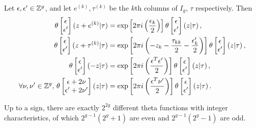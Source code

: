 \documentclass{article}
\begin{document}
\begin{prop}
	Let $\epsilon, \epsilon^\prime \in \mathbb{Z}^g$, and let $e^{(k)}, \tau^{(k)}$ be the $k$th columns of $I_g, \, \tau$ respectively. Then 
	\begin{align*}
		\theta\begin{bmatrix} \epsilon \\ \epsilon^\prime \end{bmatrix}(z+e^{(k)}|\tau) &= \exp\left[ 2\pi i \left( \frac{\epsilon_k}{2} \right) \right]\theta\begin{bmatrix} \epsilon \\ \epsilon^\prime \end{bmatrix}(z|\tau) \, , \\
		\theta\begin{bmatrix} \epsilon \\ \epsilon^\prime \end{bmatrix}(z+\tau^{(k)}|\tau) &= \exp\left[ 2\pi i \left( -z_k - \frac{\tau_{kk}}{2}-\frac{\epsilon^\prime_k}{2} \right) \right]\theta\begin{bmatrix} \epsilon \\ \epsilon^\prime \end{bmatrix}(z|\tau) \, , \\
		\theta\begin{bmatrix} \epsilon \\ \epsilon^\prime \end{bmatrix}(-z|\tau) &= \exp\left[ 2\pi i \left( \frac{\epsilon^T\epsilon^\prime }{2} \right) \right]\theta\begin{bmatrix} \epsilon \\ \epsilon^\prime \end{bmatrix}(z|\tau) \, , \\
		\forall \nu, \nu^\prime \in \mathbb{Z}^g , \, \theta\begin{bmatrix} \epsilon+2\nu \\ \epsilon^\prime+2\nu^\prime \end{bmatrix}(z|\tau) &= \exp\left[ 2\pi i \left( \frac{\epsilon^T \nu^\prime}{2} \right) \right]\theta\begin{bmatrix} \epsilon \\ \epsilon^\prime \end{bmatrix}(z|\tau) \, .
	\end{align*}
\end{prop}
\begin{corollary}
	Up to a sign, there are exactly $2^{2g}$ different theta functions with integer characteristics, of which $2^{g-1}(2^g+1)$ are even and $2^{g-1}(2^g-1)$ are odd. 
\end{corollary}
\end{document}

